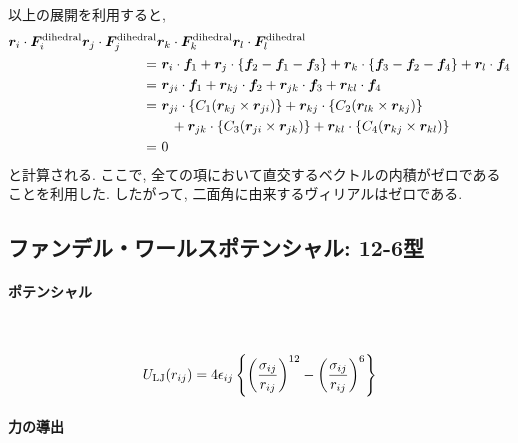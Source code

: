 以上の展開を利用すると, 
\begin{align}
    \bm{r}_{i} \cdot \bm{F}_{i}^{\mathrm{dihedral}}
    \bm{r}_{j} \cdot \bm{F}_{j}^{\mathrm{dihedral}}
 &  \bm{r}_{k} \cdot \bm{F}_{k}^{\mathrm{dihedral}}
    \bm{r}_{l} \cdot \bm{F}_{l}^{\mathrm{dihedral}}
 \notag
 \\
 =&~
    \bm{r}_{i} \cdot \bm{f}_{1}
   +\bm{r}_{j} \cdot \{\bm{f}_{2} - \bm{f}_{1} - \bm{f}_{3}\}
   +\bm{r}_{k} \cdot \{\bm{f}_{3} - \bm{f}_{2} - \bm{f}_{4}\}
   +\bm{r}_{l} \cdot \bm{f}_{4}
 \notag
 \\
 =&~
    \bm{r}_{ji} \cdot \bm{f}_{1}
   +\bm{r}_{kj} \cdot \bm{f}_{2}
   +\bm{r}_{jk} \cdot \bm{f}_{3}
   +\bm{r}_{kl} \cdot \bm{f}_{4}
 \notag
 \\
 =&~
    \bm{r}_{ji} \cdot \{ C_{1} (\bm{r}_{kj} \times \bm{r}_{ji}) \}
   +\bm{r}_{kj} \cdot \{ C_{2} (\bm{r}_{lk} \times \bm{r}_{kj}) \}
 \notag
 \\
   &~~~
   +\bm{r}_{jk} \cdot \{ C_{3} (\bm{r}_{ji} \times \bm{r}_{jk}) \}
   +\bm{r}_{kl} \cdot \{ C_{4} (\bm{r}_{kj} \times \bm{r}_{kl}) \}
 \notag
 \\
 =&~
   0
 \notag
\end{align}
と計算される. ここで, 全ての項において直交するベクトルの内積がゼロであることを利用した. 
したがって, 二面角に由来するヴィリアルはゼロである. 

\clearpage

\subsection{ファンデル・ワールスポテンシャル: 12-6型}
\paragraph{ポテンシャル} \

\begin{align}
   U_{\mathrm{LJ}}(r_{ij})
 =
   4\epsilon_{ij}
   \left\{
           \left(\frac{\sigma_{ij}}{r_{ij}}\right)^{12}
          -\left(\frac{\sigma_{ij}}{r_{ij}}\right)^{6}
   \right\}
 \notag
\end{align}
\paragraph{力の導出} \

